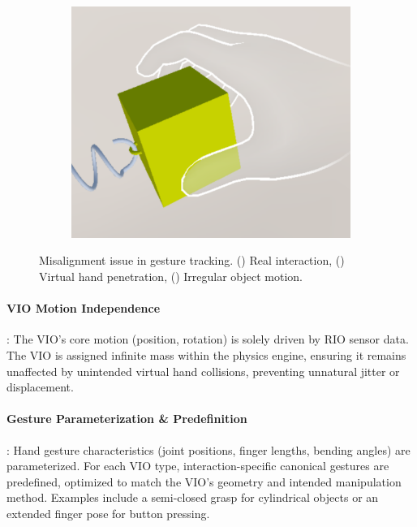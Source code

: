 \begin{figure}
\begin{subfigure}{0.31\linewidth}
    \caption{} %
    \label{fig:gesture-tracking-deviations-b}
  \end{subfigure}
  \hfill %
  \begin{subfigure}{0.31\linewidth} %
    \centering
    \includegraphics[width=\linewidth]{image/gesture-tracking-deviations-c.pdf}
    \caption{} %
    \label{fig:gesture-tracking-deviations-c}
  \end{subfigure}
  \caption{Misalignment issue in gesture tracking. () Real interaction, () Virtual hand penetration, () Irregular object motion.}
  \label{fig:gesture-tracking-deviations}
\end{figure}


\paragraph{VIO Motion Independence}: The VIO's core motion (position, rotation) is solely driven by RIO sensor data. The VIO is assigned infinite mass within the physics engine, ensuring it remains unaffected by unintended virtual hand collisions, preventing unnatural jitter or displacement.

\paragraph{Gesture Parameterization \& Predefinition}: Hand gesture characteristics (joint positions, finger lengths, bending angles) are parameterized. For each VIO type, interaction-specific canonical gestures are predefined, optimized to match the VIO's geometry and intended manipulation method. Examples include a semi-closed grasp for cylindrical objects or an extended finger pose for button pressing.


